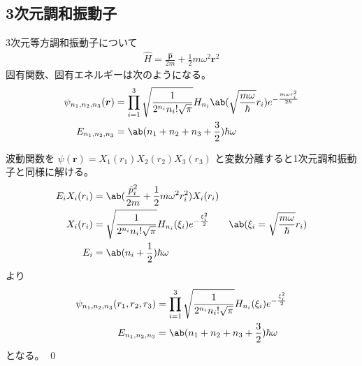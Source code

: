 \documentclass[uplatex,dvipdfmx,a4paper,11pt]{jlreq}
\makeatletter
\newcommand{\rr}{\bm{r}}
\newcommand{\pp}{\bm{p}}
\numberwithin{equation}{section}
\theoremstyle{definition}
\renewenvironment{proof}[1][\proofname]{\par
  \normalfont
  \topsep6\p@\@plus6\p@ \trivlist
  \item[\hskip\labelsep{\bfseries #1}\@addpunct{\bfseries}]\ignorespaces\quad\par
}{%
  \qed\endtrivlist\@endpefalse
}
\renewcommand\proofname{証明}
\makeatother
\begin{document}
\subsection{3次元調和振動子}
\begin{proposition}
  3次元等方調和振動子について
  \begin{align}
    \hat{H} = \frac{\hat{\pp}}{2m} + \frac{1}{2}m\omega^2\rr^2
  \end{align}
  固有関数、固有エネルギーは次のようになる。
  \begin{align}
    \psi_{n_1,n_2,n_3}(\rr) & = \prod_{i = 1}^3\sqrt{\frac{1}{2^{n_i}n_i!\sqrt{\pi}}}H_{n_i}\ab(\sqrt{\frac{m\omega}{\hbar}}r_i)e^{-\frac{m\omega r_i^2}{2\hbar}} \\
    E_{n_1,n_2,n_3}         & = \ab(n_1 + n_2 + n_3 + \frac{3}{2})\hbar\omega
  \end{align}
\end{proposition}
\begin{proof}
  波動関数を $\psi(\rr) = X_1(r_1)X_2(r_2)X_3(r_3)$ と変数分離すると1次元調和振動子と同様に解ける。
  \begin{align}
    E_iX_i(r_i) & = \ab(\frac{\hat{p}_i^2}{2m} + \frac{1}{2}m\omega^2r_i^2)X_i(r_i)                                                           \\
    X_i(r_i)    & = \sqrt{\frac{1}{2^{n_i}n_i!\sqrt{\pi}}}H_{n_i}(\xi_i)e^{-\frac{\xi_i^2}{2}} & \ab(\xi_i = \sqrt{\frac{m\omega}{\hbar}}r_i) \\
    E_i         & = \ab(n_i + \frac{1}{2})\hbar\omega
  \end{align}
  より
  \begin{align}
    \psi_{n_1,n_2,n_3}(r_1,r_2,r_3) & = \prod_{i = 1}^3\sqrt{\frac{1}{2^{n_i}n_i!\sqrt{\pi}}}H_{n_i}(\xi_i)e^{-\frac{\xi_i^2}{2}} \\
    E_{n_1,n_2,n_3}                 & = \ab(n_1 + n_2 + n_3 + \frac{3}{2})\hbar\omega
  \end{align}
  となる。
\end{proof}
\end{document}
